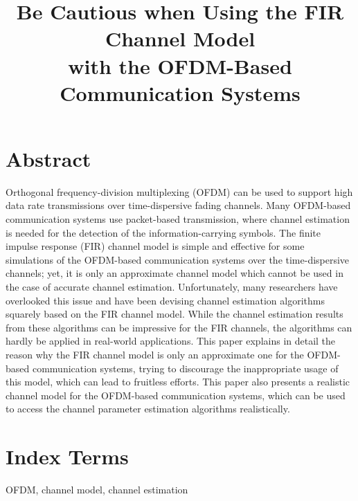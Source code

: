 \documentclass[11pt,draftnofoot,onecolumn]{IEEEtran}
\def\spacingset#1{\def\baselinestretch{#1}\small\normalsize}
\begin{document}
\spacingset{1.5}


\title{Be Cautious when Using the FIR Channel Model\\
with the OFDM-Based Communication Systems}

%
\author{
%
}
%
%
\maketitle%
%


\section*{Abstract}

Orthogonal frequency-division multiplexing (OFDM) 
can be used
to support high data rate transmissions over time-dispersive fading
channels. Many OFDM-based communication systems use packet-based
transmission, where channel estimation is needed for the detection
of the information-carrying symbols. The finite impulse response
(FIR) channel model is simple and effective for some simulations of
the OFDM-based communication systems over the time-dispersive
channels; yet, it is only an approximate channel model which cannot
be used in the case of accurate channel estimation. Unfortunately,
many researchers have overlooked this issue and have been devising
channel estimation algorithms squarely based on the FIR channel
model. While the channel estimation results from these algorithms
can be impressive for the FIR channels, the algorithms can hardly be
applied in real-world applications. This paper explains in detail
the reason why the FIR channel model is only an approximate one for
the OFDM-based communication systems, 
trying to discourage the inappropriate usage
of this model, which can lead to fruitless efforts. This paper also
presents a realistic channel model for the OFDM-based communication
systems, which can be used to access the channel parameter
estimation algorithms
realistically.%


\section*{ Index Terms}

OFDM, channel model, channel estimation
\end{document}
